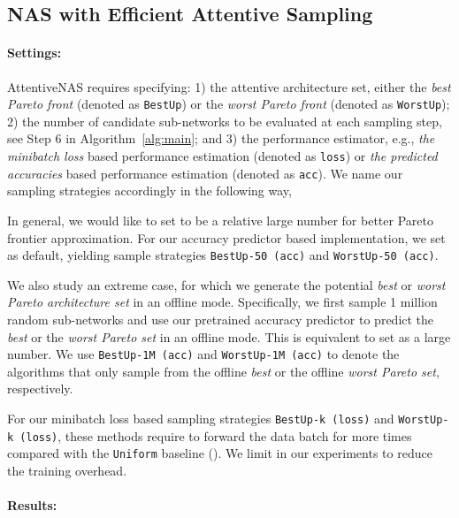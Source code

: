 \documentclass[final]{cvpr}
\theoremstyle{definition}
\begin{document}
\subsection{NAS with Efficient Attentive Sampling}
\label{sec:attentive_nas}

\paragraph{Settings:}
AttentiveNAS requires specifying: 
1) the attentive architecture set, either the \emph{best Pareto front} (denoted as \texttt{BestUp}) or the \emph{worst Pareto front} (denoted as \texttt{WorstUp});
2) the number of candidate sub-networks   to be evaluated at each sampling step, see Step 6 in Algorithm~\ref{alg:main}; 
and 3) the performance estimator, e.g., \emph{the minibatch loss} based performance estimation (denoted as \texttt{loss}) or \emph{the predicted accuracies} based performance estimation (denoted as \texttt{acc}).
We name our sampling strategies accordingly in the following way, 



In general, we would like to set  to be a relative large number for better 
Pareto frontier approximation. 
For our accuracy predictor based implementation, we set  as default, yielding sample strategies \texttt{BestUp-50 (acc)} and \texttt{WorstUp-50 (acc)}.

We also study an extreme case, 
for which we generate the potential \emph{best} or \emph{worst Pareto architecture set} in an offline mode. 
Specifically, we first sample 1 million random sub-networks and use our pretrained accuracy predictor to predict the \emph{best} or the  \emph{worst Pareto set} in an offline mode. 
This is equivalent to set  as a large number. 
We use \texttt{BestUp-1M (acc)} and \texttt{WorstUp-1M (acc)} to denote the algorithms that only sample from the offline \emph{best} or the offline \emph{worst Pareto set}, respectively.  

For our minibatch loss based sampling strategies \texttt{BestUp-k (loss)} and  \texttt{WorstUp-k (loss)}, 
these methods require to forward the data batch for  
more times compared with the \texttt{Uniform} baseline ().  
We limit  in our experiments to reduce the training overhead. 

\paragraph{Results:} 
\end{document}
